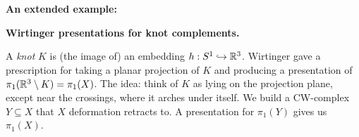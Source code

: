 
\overfullrule=0pt
\parindent=0pt

\nopagenumbers







\def\cltr{\Red}		  %

\loadmsbm



\def\ctln{\centerline}
\def\u{\underbar}
\def\ssk{\smallskip}
\def\msk{\medskip}
\def\bsk{\bigskip}
\def\hsk{\hskip.1in}
\def\hhsk{\hskip.2in}
\def\dsl{\displaystyle}
\def\hskp{\hskip1.5in}

\def\lra{$\Leftrightarrow$ }
\def\ra{\rightarrow}
\def\mpto{\logmapsto}
\def\pu{\pi_1}
\def\mpu{$\pi_1$}
\def\sig{\Sigma}
\def\msig{$\Sigma$}
\def\ep{\epsilon}
\def\sset{\subseteq}
\def\del{\partial}
\def\inv{^{-1}}
\def\wtl{\widetilde}
\def\del{\partial}
\def\delp{\partial^\prime}
\def\delpp{\partial^{\prime\prime}}
\def\sgn{{\roman{sgn}}}
\def\wtih{\widetilde{H}}
\def\bbz{{\Bbb Z}}
\def\bbr{{\Bbb R}}
\def\rtar{$\Rightarrow$}

\def\cltr{\Red}		  %
\def\cltb{\Blue}		  %
\def\cltg{\PineGreen}	  %


{\bf An extended example:}

\ctln{\bf Wirtinger presentations for knot complements.}

\msk

A {\it knot} $K$ is (the image of) an embedding $h:S^1\hookrightarrow\bbr^3$. Wirtinger 
gave a prescription for taking a planar projection of $K$ and producing a presentation
of $\pi_1(\bbr^3\setminus K)=\pi_1(X)$. The idea: think of $K$ as lying on the projection
plane, except near the crossings, where it arches under itself. 
We build a CW-complex $Y\subseteq X$ that $X$ deformation retracts to. A presentation for $\pi_1(Y)$
gives us $\pi_1(X)$.

\msk

\vbox{\hsize=2in
\leavevmode
\epsfxsize=3in
}

\msk

\hskip1.5in
\vbox{\hsize=3in
\leavevmode
\epsfxsize=3in
}


